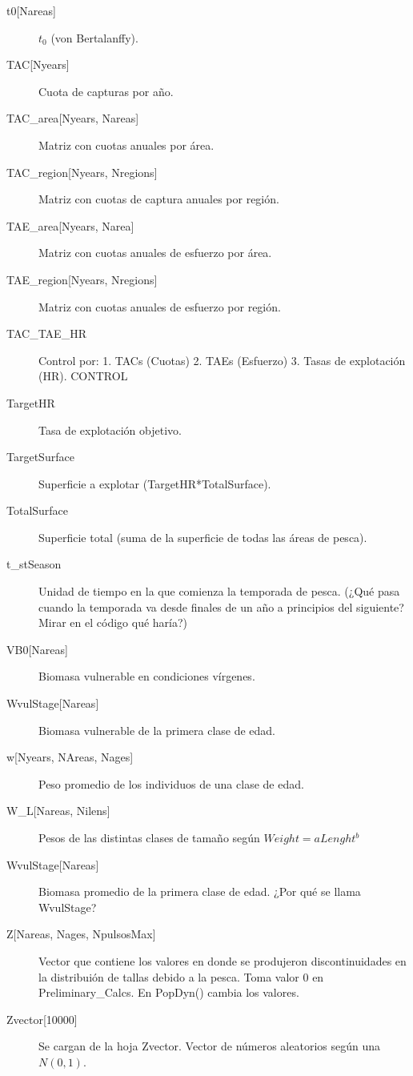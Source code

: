 \begin{description}
		\item[t0{[}Nareas{]}] $t_0$ (von Bertalanffy).
		\item[TAC{[}Nyears{]}] Cuota de capturas por año.
		\item[TAC\_area{[}Nyears, Nareas{]}] Matriz con cuotas anuales por área.
		\item[TAC\_region{[}Nyears, Nregions{]}] Matriz con cuotas de captura anuales por región.
		\item[TAE\_area{[}Nyears, Narea{]}] Matriz con cuotas anuales de esfuerzo por área.
		\item[TAE\_region{[}Nyears, Nregions{]}] Matriz con cuotas anuales de esfuerzo por región. 
		\item[TAC\_TAE\_HR] Control por: 1. TACs (Cuotas) 2. TAEs (Esfuerzo) 3. Tasas de explotación (HR). CONTROL
		\item[TargetHR] Tasa de explotación objetivo.
		\item[TargetSurface] Superficie a explotar (TargetHR*TotalSurface).
		\item[TotalSurface] Superficie total (suma de la superficie de todas las áreas de pesca).
		\item[t\_stSeason] Unidad de tiempo en la que comienza la temporada de pesca. (¿Qué pasa cuando la temporada va desde finales de un año a principios del siguiente?Mirar en el código qué haría?)
		
		\item[VB0{[}Nareas{]}] Biomasa vulnerable en condiciones vírgenes. 
		\item[WvulStage{[}Nareas{]}] Biomasa vulnerable de la primera clase de edad.
		
		\item[w{[}Nyears, NAreas, Nages{]}] Peso promedio de los individuos de una clase de edad.
		\item[W\_L{[}Nareas, Nilens{]}] Pesos de las distintas clases de tamaño según $Weight=a Lenght^b$
		\item[WvulStage{[}Nareas{]}] Biomasa promedio de la primera clase de edad. ¿Por qué se llama WvulStage?
		   
		\item[Z{[}Nareas, Nages, NpulsosMax{]}] Vector que contiene los valores en donde se produjeron discontinuidades en la distribuión de tallas debido a la pesca. Toma valor 0 en Preliminary\_Calcs. En PopDyn() cambia los valores.
		\item[Zvector{[}10000{]}] Se cargan de la hoja Zvector.
		Vector de números aleatorios según una $N(0,1)$.
		
		\end{description}
